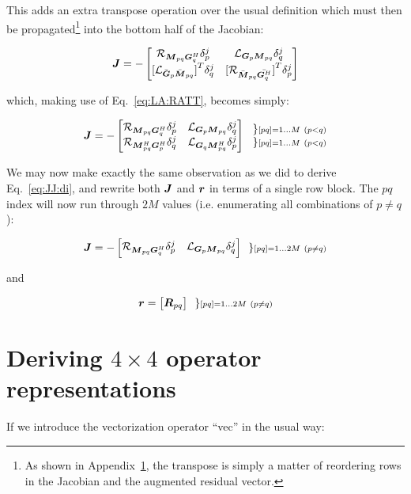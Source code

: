 \documentclass[useAMS,usenatbib]{mn2e}
\newcommand{\mat}[1]{{\bmath{#1}}}
\newcommand{\JJ}{\mat{J}} %
\newcommand{\MM}{\mat{M}}
\newcommand{\GG}{\mat{G}}
\begin{document}
This adds an extra transpose operation over the usual definition which must then be propagated\footnote{As shown in Appendix~\ref{sec:4x4app}, the transpose is simply a matter of reordering rows in the Jacobian and the augmented residual vector.} into the bottom half of the Jacobian:

\[
\JJ = - \Matrix{cc}{ 
\Rop{ \MM_{pq}\GG^H_q }\delta^j_p & 
\Lop{ \GG_p \MM_{pq}  }\delta^j_q \\
{[ \Lop{ \bar{\GG}_p    \bar{\MM}_{pq} } ]}^T\delta^j_q & 
{[ \Rop{ \bar{\MM}_{pq} \bar{\GG^H_q}  } ]}^T\delta^j_p  
}
\]

which, making use of Eq.~\ref{eq:LA:RATT}, becomes simply:

\[
\JJ = - \Matrix{cc}{ 
\Rop{ \MM_{pq}\GG^H_q }\delta^j_p & 
\Lop{ \GG_p \MM_{pq}  }\delta^j_q \\
\Rop{ \MM^H_{pq} \GG^H_p } \delta^j_q & 
\Lop{ \GG_q \MM^H_{pq}  } \delta^j_p  
}~~ 
\Stack{ 
\} \scriptstyle [pq]=1\dots M~(p<q) \\ 
\} \scriptstyle [pq]=1\dots M~(p<q) 
}
\]

We may now make exactly the same observation as we did to derive Eq.~\ref{eq:JJ:di}, and rewrite both $\JJ$ and $\bmath{r}$ in terms of 
a single row block. The $pq$ index will now run through $2M$ values (i.e. enumerating all combinations of $p\ne q$):

\begin{equation}
\JJ = - \Matrix{cc}{ 
\Rop{ \MM_{pq}\GG^H_q }\delta^j_p & 
\Lop{ \GG_p \MM_{pq}  }\delta^j_q \\
}~~ 
\} \scriptstyle [pq]=1\dots 2M~(p\ne q)\\ 
\end{equation}

and 

\begin{equation}
\bmath{r} = \Matrix{c}{ \mat{R}_{pq}}~~ 
\} \scriptstyle [pq]=1\dots 2M~(p\ne q)\\ 
\end{equation}







\appendix

\section{Deriving $4\times4$ operator representations}
\label{sec:4x4app}

If we introduce the vectorization operator ``vec'' in the usual way:
\end{document}
